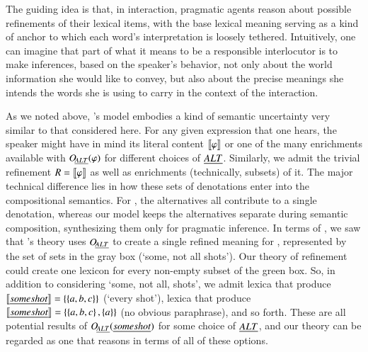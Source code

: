 \documentclass[leqno,12pt]{article}
\begin{document}

The guiding idea is that, in interaction, pragmatic agents reason
about possible refinements of their lexical items, with the base
lexical meaning serving as a kind of anchor to which each word's
interpretation is loosely tethered.  Intuitively, one can imagine that
part of what it means to be a responsible interlocutor is to make
inferences, based on the speaker's behavior, not only about the world
information she would like to convey, but also about the precise
meanings she intends the words she is using to carry in the context of
the interaction.


As we noted above, \CFS's model embodies a kind of semantic
uncertainty very similar to that considered here. For any given
expression that one hears, the speaker might have in mind its literal
content $\llbracket\varphi\rrbracket$ or one of the many enrichments available with
$\mathop{O\negthinspace_{\emph{ALT}}}(\varphi)$ for different choices of $\emph{ALT}$. Similarly, we admit
the trivial refinement $R = \llbracket\varphi\rrbracket$ as well as enrichments
(technically, subsets) of it. The major technical difference lies in
how these sets of denotations enter into the compositional
semantics. For \CFS, the alternatives all contribute to a single
denotation, whereas our model keeps the alternatives separate during
semantic composition, synthesizing them only for pragmatic
inference. In terms of , we saw that \CFS's theory
uses $\mathop{O\negthinspace_{\emph{ALT}}}$ to create a single refined meaning for ,
represented by the set of sets in the gray box (`some, not all
shots'). Our theory of refinement could create one lexicon for every
non-empty subset of the green box. So, in addition to considering
`some, not all, shots', we admit lexica that produce
$\llbracket\emph{some shot}\rrbracket = \left\{ \left\{ a,b,c \right\} \right\}$ (`every shot'), lexica
that produce $\llbracket\emph{some shot}\rrbracket = \left\{ \left\{ a,b,c \right\},\left\{ a \right\} \right\}$ (no
obvious paraphrase), and so forth. These are all potential results of
$\mathop{O\negthinspace_{\emph{ALT}}}(\emph{some shot})$ for some choice of $\emph{ALT}$, and our theory
can be regarded as one that reasons in terms of all of these options.
\end{document}
